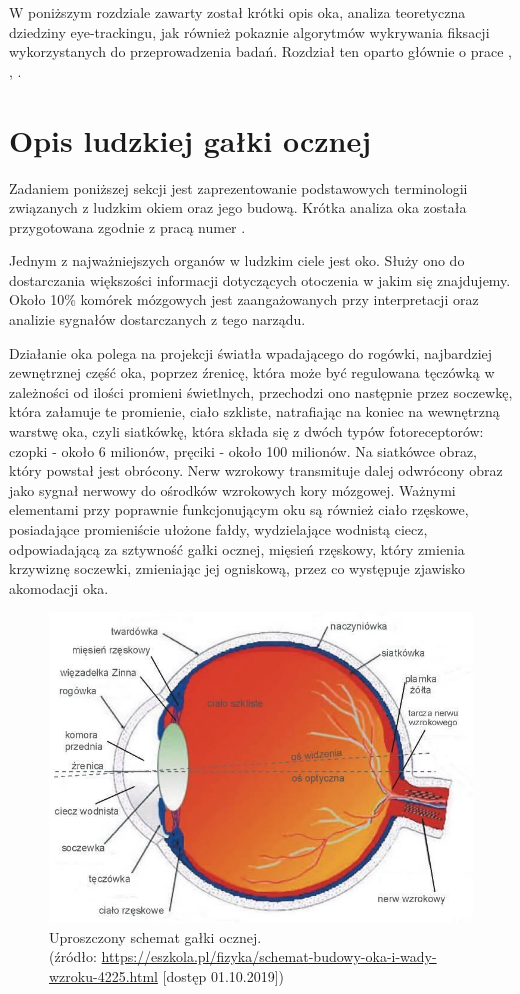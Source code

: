 W poniższym rozdziale zawarty został krótki opis oka, analiza teoretyczna dziedziny eye-trackingu, jak również pokaznie algorytmów wykrywania fiksacji wykorzystanych do przeprowadzenia badań. Rozdział ten oparto głównie o prace \cite{Main}, \cite{EvaluationMethodology}, \cite{MachineLearning}.
\section{Opis ludzkiej gałki ocznej}
Zadaniem poniższej sekcji jest zaprezentowanie podstawowych terminologii związanych z ludzkim okiem oraz jego budową. Krótka analiza oka została przygotowana zgodnie z pracą numer \cite{EvaluationMethodology}.\par
Jednym z najważniejszych organów w ludzkim ciele jest oko. Służy ono do dostarczania większości informacji dotyczących otoczenia w jakim się znajdujemy. Około 10\% komórek mózgowych jest zaangażowanych przy interpretacji oraz analizie sygnałów dostarczanych z tego narządu.\par
Działanie oka polega na projekcji światła wpadającego do rogówki, najbardziej zewnętrznej część oka, poprzez źrenicę, która może być regulowana tęczówką w zależności od ilości promieni świetlnych, przechodzi ono następnie przez soczewkę, która załamuje te promienie, ciało szkliste, natrafiając na koniec na wewnętrzną warstwę oka, czyli siatkówkę, która składa się z dwóch typów fotoreceptorów: czopki - około 6 milionów, pręciki - około 100 milionów. Na siatkówce obraz, który powstał jest obrócony. Nerw wzrokowy transmituje dalej odwrócony obraz jako sygnał nerwowy do ośrodków wzrokowych kory mózgowej. Ważnymi elementami przy poprawnie funkcjonującym oku są również ciało rzęskowe, posiadające promieniście ułożone fałdy, wydzielające wodnistą ciecz, odpowiadającą za sztywność gałki ocznej, mięsień rzęskowy, który zmienia krzywiznę soczewki, zmieniając jej ogniskową, przez co występuje zjawisko akomodacji oka. 
\begin{figure}[H]
    \centering
    \captionsetup{justification=centering,margin=2cm}
    \includegraphics[width=0.8\linewidth]{resources/oko_galka.jpg}
    \caption[Przekrój oka.]{Uproszczony schemat gałki ocznej.\\\hspace{\textwidth} 
    \small(źródło: \url{https://eszkola.pl/fizyka/schemat-budowy-oka-i-wady-wzroku-4225.html} [dostęp 01.10.2019])}
    \label{fig:budowaoka}
\end{figure}
